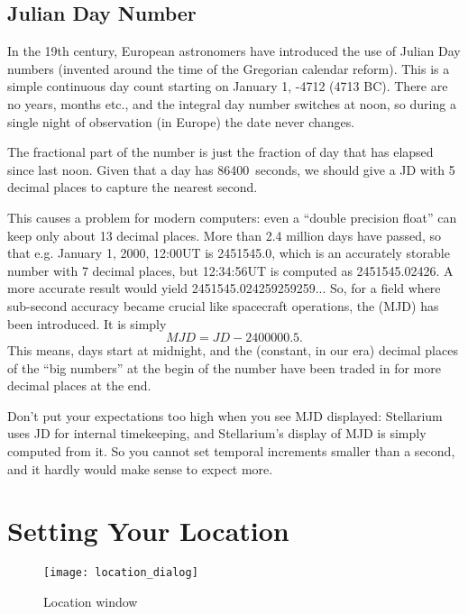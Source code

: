 \subsection{Julian Day Number}
\label{sec:gui:date:julian}

In the 19th century, European astronomers have introduced the use of
Julian Day numbers (invented around the time of the Gregorian calendar
reform). This is a simple continuous day count starting on January 1, -4712
(4713 BC). There are no years, months etc., and the integral day
number switches at noon, so during a single night of observation (in
Europe) the date never changes. 

The fractional part of the number is just the fraction of day that has
elapsed since last noon. Given that a day has 86400~seconds, we should
give a JD with 5 decimal places to capture the nearest second.

This causes a problem for modern computers: even a ``double precision
float'' can keep only about 13 decimal places. More than 2.4 million
days have passed, so that e.g. January 1, 2000, 12:00UT is 2451545.0,
which is an accurately storable number with 7 decimal places, but 12:34:56UT is computed as
2451545.02426. A more accurate result would yield
2451545.024259259259... So, for a field where sub-second accuracy
became crucial like spacecraft operations, the  (MJD) has been introduced. It is simply
\begin{equation}
  \label{eq:MJD}
  MJD=JD-2400000.5. 
\end{equation}
This means, days start at midnight, and the (constant, in our era)
decimal places of the ``big numbers'' at the begin of the number have
been traded in for more decimal places at the end. 

Don't put your expectations too high when you see MJD displayed:
Stellarium uses JD for internal timekeeping, and Stellarium's display
of MJD is simply computed from it. So you cannot set temporal
increments smaller than a second, and it hardly would make sense to
expect more.

\section{Setting Your Location}
\label{sec:gui:location}

\begin{figure}[htb]
\centering\texttt{[image: location\_dialog]}
\caption{Location window}
\label{fig:gui:location}
\end{figure}

